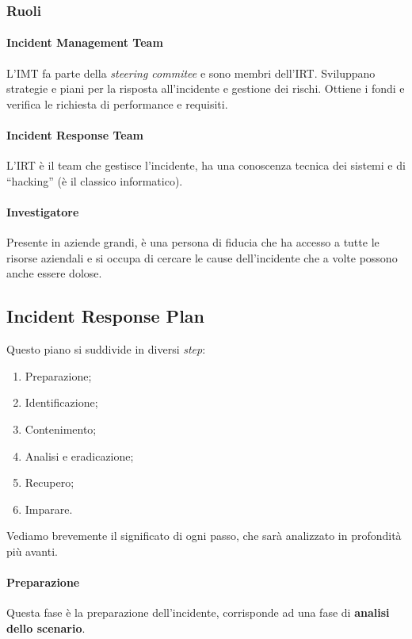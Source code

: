 \subsubsection{Ruoli}

\paragraph*{Incident Management Team} L'IMT fa parte della \textit{steering 
commitee} e sono membri dell'IRT. Sviluppano strategie e piani per la risposta 
all'incidente e gestione dei rischi. Ottiene i fondi e verifica le richiesta 
di performance e requisiti.

\paragraph*{Incident Response Team} L'IRT è il
team che gestisce l'incidente, ha una conoscenza tecnica dei sistemi e di
``hacking'' (è il classico informatico).

\paragraph*{Investigatore} Presente in aziende grandi, è una persona di fiducia
che ha accesso a tutte le risorse aziendali e si occupa di cercare le cause
dell'incidente che a volte possono anche essere dolose.



\subsection{Incident Response Plan}

Questo piano si suddivide in diversi \textit{step}:
\begin{enumerate}
\item Preparazione;
\item Identificazione;
\item Contenimento;
\item Analisi e eradicazione;
\item Recupero;
\item Imparare.
\end{enumerate}

Vediamo brevemente il significato di ogni passo, che sarà analizzato in
profondità più avanti.

\paragraph*{Preparazione} Questa fase è la preparazione dell'incidente, 
corrisponde ad una fase di \textbf{analisi dello scenario}.

